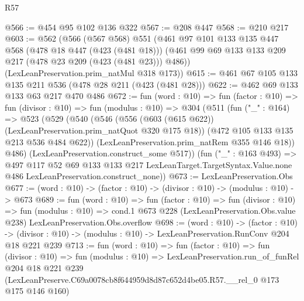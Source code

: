 \begin{lexlean}{R57}
\begin{coremodule}
@566 := @454 @95 @102 @136 @322
@567 := @208 @447
@568 := @210 @217
@603 := @562
    (@566
      (@567 @568)
      @551
      (@461
        @97
        @101
        @133
        @135
        @447
        @568
        (@478 @18 @447 (@423 (@481 @18)))
        (@461 @99 @69 @133 @133 @209 @217 (@478 @23 @209 (@423 (@481 @23))) @486))
      (LexLeanPreservation.prim_natMul @318 @173))
@615 := @461 @67 @105 @133 @135 @211 @536 (@478 @28 @211 (@423 (@481 @28)))
@622 := @462 @69 @133 @133 @63 @217 @470 @486
@672 := fun (word : @10) =>
  fun (factor : @10) =>
  fun (divisor : @10) =>
  fun (modulus : @10) =>
  @304
    (@511
      (fun ("_" : @164) =>
      @523
        (@529
          (@540
            (@546
              (@556 (@603 (@615 @622)) (LexLeanPreservation.prim_natQuot @320 @175 @18))
              (@472 @105 @133 @135 @213 @536 @484 @622))
            (LexLeanPreservation.prim_natRem @355 @146 @18))
          @486)
        (LexLeanPreservation.construct_some @517))
      (fun ("_" : @163 @493) =>
      @497
        @117
        @52
        @69
        @133
        @133
        @217
        LexLeanTarget.TargetSyntax.Value.none
        @486
        LexLeanPreservation.construct_none))
@673 := LexLeanPreservation.Obs
@677 := (word : @10) -> (factor : @10) -> (divisor : @10) -> (modulus : @10) -> @673
@689 := fun (word : @10) =>
  fun (factor : @10) =>
  fun (divisor : @10) =>
  fun (modulus : @10) =>
  cond.{1} @673 @228 (LexLeanPreservation.Obs.value @238) LexLeanPreservation.Obs.overflow
@698 := (word : @10) ->
  (factor : @10) ->
  (divisor : @10) -> (modulus : @10) -> LexLeanPreservation.RunConv @204 @18 @221 @239
@713 := fun (word : @10) =>
  fun (factor : @10) =>
  fun (divisor : @10) =>
  fun (modulus : @10) =>
  LexLeanPreservation.run_of_funRel
    @204
    @18
    @221
    @239
    (LexLeanPreserve.C69a0078cb8f644959d8d87c652d4be05.R57.__rel_0 @173 @175 @146 @160)
\end{coremodule}
\end{lexlean}
